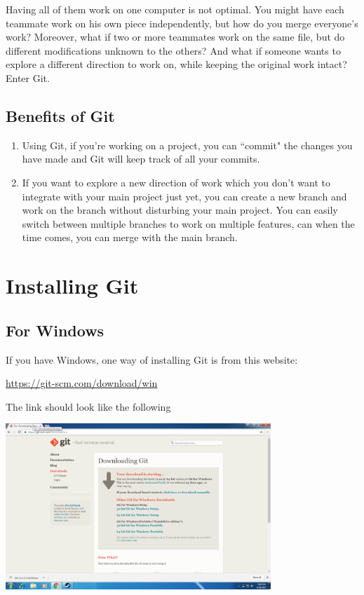 \documentclass[12pt]{report}
\begin{document}
Having all of them work on one computer is not optimal. You might have each teammate work on his own piece independently, but how do you merge everyone's work? Moreover, what if two or more teammates work on the same file, but do different modifications unknown to the others? And what if someone wants to explore a different direction to work on, while keeping the original work intact? Enter Git.

\section{Benefits of Git}
\begin{enumerate}
  \item Using Git, if you're working on a project, you can ``commit" the changes you have made and Git will keep track of all your commits. 
  
  \item If you want to explore a new direction of work which you don't want to integrate with your main project just yet, you can create a new branch and work on the branch without disturbing your main project. You can easily switch between multiple branches to work on multiple features, can when the time comes, you can merge with the main branch. 
\end{enumerate}

\chapter{Installing Git}

\section{For Windows}
If you have Windows, one way of installing Git is from this website:

\url{https://git-scm.com/download/win}

The link should look like the following

\includegraphics[width=0.75\textwidth]{windows-download}
\end{document}
